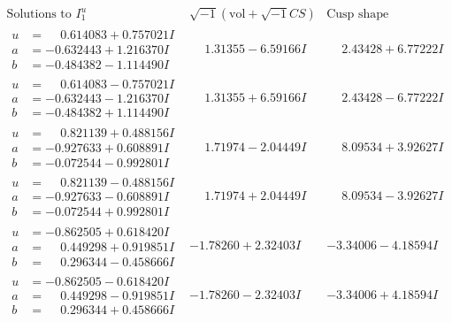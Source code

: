 \documentclass[1p]{elsarticle_modified}
\theoremstyle{definition}
\newcommand{\I}{\sqrt{-1}}
\begin{document}
$$\begin{array}{c|c|c}  
\text{Solutions to }I^u_{1}& \I (\text{vol} + \sqrt{-1}CS) & \text{Cusp shape}\\
 \hline 
\begin{aligned}
u &= \phantom{-}0.614083 + 0.757021 I \\
a &= -0.632443 + 1.216370 I \\
b &= -0.484382 - 1.114490 I\end{aligned}
 & \phantom{-}1.31355 - 6.59166 I & \phantom{-}2.43428 + 6.77222 I \\ \hline\begin{aligned}
u &= \phantom{-}0.614083 - 0.757021 I \\
a &= -0.632443 - 1.216370 I \\
b &= -0.484382 + 1.114490 I\end{aligned}
 & \phantom{-}1.31355 + 6.59166 I & \phantom{-}2.43428 - 6.77222 I \\ \hline\begin{aligned}
u &= \phantom{-}0.821139 + 0.488156 I \\
a &= -0.927633 + 0.608891 I \\
b &= -0.072544 - 0.992801 I\end{aligned}
 & \phantom{-}1.71974 - 2.04449 I & \phantom{-}8.09534 + 3.92627 I \\ \hline\begin{aligned}
u &= \phantom{-}0.821139 - 0.488156 I \\
a &= -0.927633 - 0.608891 I \\
b &= -0.072544 + 0.992801 I\end{aligned}
 & \phantom{-}1.71974 + 2.04449 I & \phantom{-}8.09534 - 3.92627 I \\ \hline\begin{aligned}
u &= -0.862505 + 0.618420 I \\
a &= \phantom{-}0.449298 + 0.919851 I \\
b &= \phantom{-}0.296344 - 0.458666 I\end{aligned}
 & -1.78260 + 2.32403 I & -3.34006 - 4.18594 I \\ \hline\begin{aligned}
u &= -0.862505 - 0.618420 I \\
a &= \phantom{-}0.449298 - 0.919851 I \\
b &= \phantom{-}0.296344 + 0.458666 I\end{aligned}
 & -1.78260 - 2.32403 I & -3.34006 + 4.18594 I \\ \hline\begin{aligned}

\end{aligned}
\end{array}$$
\end{document}
